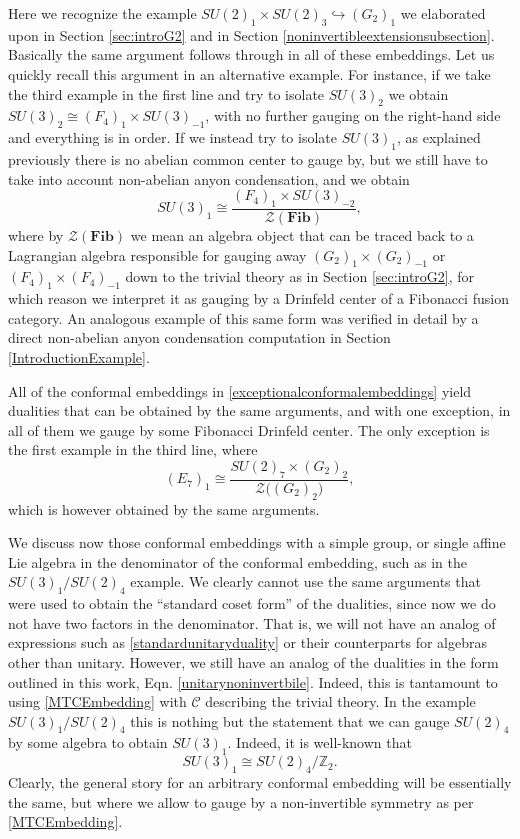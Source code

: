 \documentclass[11pt]{article}
\numberwithin{equation}{section}
\begin{document}
Here we recognize the example $SU(2)_{1} \times SU(2)_{3} \hookrightarrow (G_{2})_{1}$ we elaborated upon in Section \ref{sec:introG2} and in Section \ref{noninvertibleextensionsubsection}. Basically the same argument follows through in all of these embeddings. Let us quickly recall this argument in an alternative example. For instance, if we take the third example in the first line and try to isolate $SU(3)_{2}$ we obtain $SU(3)_{2} \cong (F_{4})_{1} \times SU(3)_{-1}$, with no further gauging on the right-hand side and everything is in order. If we instead try to isolate $SU(3)_{1}$, as explained previously there is no abelian common center to gauge by, but we still have to take into account non-abelian anyon condensation, and we obtain
\begin{equation}
    SU(3)_{1} \cong \frac{(F_{4})_{1} \times SU(3)_{-2}}{\mathcal{Z}(\mathbf{Fib})},
\end{equation}
where by $\mathcal{Z}(\mathbf{Fib})$ we mean an algebra object that can be traced back to a Lagrangian algebra responsible for gauging away $(G_{2})_{1} \times (G_{2})_{-1}$ or $(F_{4})_{1} \times (F_{4})_{-1}$ down to the trivial theory as in Section \ref{sec:introG2}, for which reason we interpret it as gauging by a Drinfeld center of a Fibonacci fusion category. An analogous example of this same form was verified in detail by a direct non-abelian anyon condensation computation in Section \ref{IntroductionExample}.


All of the conformal embeddings in \eqref{exceptionalconformalembeddings} yield dualities that can be obtained by the same arguments, and with one exception, in all of them we gauge by some Fibonacci Drinfeld center. The only exception is the first example in the third line, where
\begin{equation}
    (E_{7})_{1} \cong \frac{SU(2)_{7} \times (G_{2})_{2}}{\mathcal{Z}\big((G_{2})_{2}\big)},
\end{equation}
which is however obtained by the same arguments. 

We discuss now those conformal embeddings with a simple group, or single affine Lie algebra in the denominator of the conformal embedding, such as in the $SU(3)_{1}/SU(2)_{4}$ example. We clearly cannot use the same arguments that were used to obtain the ``standard coset form'' of the dualities, since now we do not have two factors in the denominator. That is, we will not have an analog of expressions such as \eqref{standardunitaryduality} or their counterparts for algebras other than unitary. However, we still have an analog of the dualities in the form outlined in this work, Eqn. \eqref{unitarynoninvertbile}. Indeed, this is tantamount to using \eqref{MTCEmbedding} with $\mathcal{C}$ describing the trivial theory. In the example $SU(3)_{1}/SU(2)_{4}$ this is nothing but the statement that we can gauge $SU(2)_{4}$ by some algebra to obtain $SU(3)_{1}$. Indeed, it is well-known that 
\begin{equation}
    SU(3)_{1} \cong SU(2)_{4}/\mathbb{Z}_{2}.
\end{equation}
Clearly, the general story for an arbitrary conformal embedding will be essentially the same, but where we allow to gauge by a non-invertible symmetry as per \eqref{MTCEmbedding}.
\end{document}
